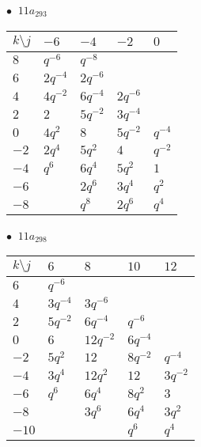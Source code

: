 \begin{minipage}{\linewidth}
$\bullet\ $ $11a_{293}$ \vspace{0.5em} \\
\begin{tabular}{l|llll}
$k \setminus j$ & $-6$ & $-4$ & $-2$ & $0$ \\
\hline
$8$ & $q^{-6}$ & $q^{-8}$ &  &  \\
$6$ & $2q^{-4}$ & $2q^{-6}$ &  &  \\
$4$ & $4q^{-2}$ & $6q^{-4}$ & $2q^{-6}$ &  \\
$2$ & $2$ & $5q^{-2}$ & $3q^{-4}$ &  \\
$0$ & $4q^{2}$ & $8$ & $5q^{-2}$ & $q^{-4}$ \\
$-2$ & $2q^{4}$ & $5q^{2}$ & $4$ & $q^{-2}$ \\
$-4$ & $q^{6}$ & $6q^{4}$ & $5q^{2}$ & $1$ \\
$-6$ &  & $2q^{6}$ & $3q^{4}$ & $q^{2}$ \\
$-8$ &  & $q^{8}$ & $2q^{6}$ & $q^{4}$ \\
\end{tabular}
\vspace{2em}
\end{minipage}
%
\begin{minipage}{\linewidth}
$\bullet\ $ $11a_{298}$ \vspace{0.5em} \\
\begin{tabular}{l|llll}
$k \setminus j$ & $6$ & $8$ & $10$ & $12$ \\
\hline
$6$ & $q^{-6}$ &  &  &  \\
$4$ & $3q^{-4}$ & $3q^{-6}$ &  &  \\
$2$ & $5q^{-2}$ & $6q^{-4}$ & $q^{-6}$ &  \\
$0$ & $6$ & $12q^{-2}$ & $6q^{-4}$ &  \\
$-2$ & $5q^{2}$ & $12$ & $8q^{-2}$ & $q^{-4}$ \\
$-4$ & $3q^{4}$ & $12q^{2}$ & $12$ & $3q^{-2}$ \\
$-6$ & $q^{6}$ & $6q^{4}$ & $8q^{2}$ & $3$ \\
$-8$ &  & $3q^{6}$ & $6q^{4}$ & $3q^{2}$ \\
$-10$ &  &  & $q^{6}$ & $q^{4}$ \\
\end{tabular}
\vspace{2em}
\end{minipage}
%
